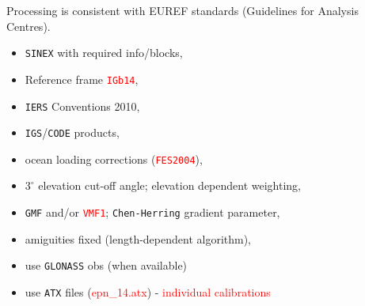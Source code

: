 \documentclass[landscape,a0paper,fontscale=0.346]{baposter} %
\begin{document}
\begin{poster}
{ Processing is consistent with EUREF standards (Guidelines for Analysis Centres).
  \begin{itemize}%
    \item \texttt{SINEX} with required info/blocks,
    \item Reference frame \texttt{\textcolor{red}{IGb14}},
    \item \texttt{IERS} Conventions 2010,
    \item \texttt{IGS}/\texttt{CODE} products,
    \item ocean loading corrections (\texttt{\textcolor{red}{FES2004}}),
    \item $3^{\circ}$ elevation cut-off angle; elevation dependent weighting,
    \item \texttt{GMF} and/or \texttt{\textcolor{red}{VMF1}}; \texttt{Chen-Herring} gradient parameter,
    \item amiguities fixed (length-dependent algorithm),
    \item use \texttt{GLONASS} obs (when available)
    \item use \texttt{ATX} files  (\textcolor{red}{epn\_14.atx}) - \textcolor{red}{individual calibrations}
  \end{itemize}


  
}
\end{poster}
\end{document}
